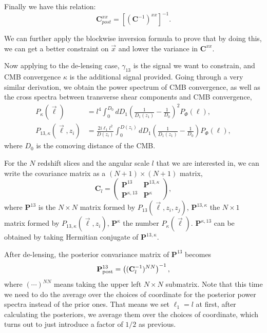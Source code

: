 Finally we have this relation:
\begin{equation}
\mathbf{C}_{post}^{xx}=\left[\left(\mathbf{C}^{-1}\right)^{xx}\right]^{-1}.
\end{equation}

We can further apply the blockwise inversion formula to prove that by doing this, we can get a better constraint on $\vec{x}$ and lower the variance in $\mathbf{C}^{xx}$.

Now applying to the de-lensing case, $\gamma_{13}$ is the signal we want to constrain, and CMB convergence $\kappa$ is the additional signal provided. Going through a very similar derivation, we obtain the power spectrum of CMB convergence, as well as the cross spectra between transverse shear components and CMB convergence,
\begin{align}
P_{\kappa}(\vec{\ell})&=l^4\int_0^{D_0}dD_1\left(\frac{1}{D_1(z_1)}-\frac{1}{D_0}\right)^2P_\Phi(\ell),\nonumber\\
P_{13,\kappa}(\vec{\ell},z_i)&=\frac{2i\ell_1l^2}{D(z_i)}\int_0^{D(z_i)}dD_1\left(\frac{1}{D_1(z_1)}-\frac{1}{D_0}\right)P_\Phi(\ell),
\end{align}
where $D_0$ is the comoving distance of the CMB.

For the $N$ redshift slices and the angular scale $l$ that we are interested in, we can write the covariance matrix as a $(N+1)\times(N+1)$ matrix,
\begin{equation}
\mathbf{C}_l=\left(\begin{array}{ll}
\mathbf{P}^{13} & \mathbf{P}^{13,\kappa}\\
\mathbf{P}^{\kappa,13} & \mathbf{P}^{\kappa}
\end{array}\right),
\end{equation}
where $\mathbf{P}^{13}$ is the $N\times N$ matrix formed by $P_{13}(\vec{\ell},z_i,z_j)$, $\mathbf{P}^{13,\kappa}$ the $N\times 1$ matrix formed by $P_{13,\kappa}(\vec{\ell},z_i)$, $\mathbf{P}^{\kappa}$ the number $P_{\kappa}(\vec{\ell})$. $\mathbf{P}^{\kappa,13}$ can be obtained by taking Hermitian conjugate of $\mathbf{P}^{13,\kappa}$.

After de-lensing, the posterior convariance matrix of $\mathbf{P}^{13}$ becomes
\begin{equation}
\mathbf{P}_{\rm post}^{13}=\left( (\mathbf{C}_l^{-1})^{NN} \right)^{-1},
\end{equation}
where $(\cdots)^{NN}$ means taking the upper left $N\times N$ submatrix. Note that this time we need to do the average over the choices of coordinate for the posterior power spectra instead of the prior ones. That means we set $\ell_1=l$ at first, after calculating the posteriors, we average them over the choices of coordinate, which turns out to just introduce a factor of $1/2$ as previous.

